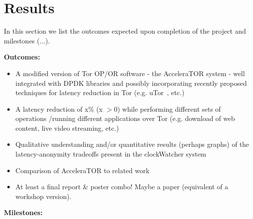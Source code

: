 \section{Results}
\label{sec:results}

In this section we list the outcomes expected upon completion of the project 
and milestones (...).



\textbf{Outcomes:}

\begin{itemize}
	
	\item A modified version of Tor OP\slash OR software - the AcceleraTOR 
	system - well integrated with DPDK libraries and possibly incorporating 
	recently proposed techniques for latency reduction in Tor (e.g. 
	uTor~\cite{179191}, etc.)
	
	\item A latency reduction of x\% (x $> 0$) while performing different sets 
	of operations \slash running different applications over Tor (e.g. download 
	of web content, live video streaming, etc.)
	
	\item Qualitative understanding and/or quantitative results (perhaps graphs) of the 
	latency-anonymity tradeoffs present in the clockWatcher system
	
	\item Comparison of AcceleraTOR to related work 
	
	\item At least a final report \& poster combo! Maybe a paper (equivalent of a workshop version).

\end{itemize}

\textbf{Milestones:}

